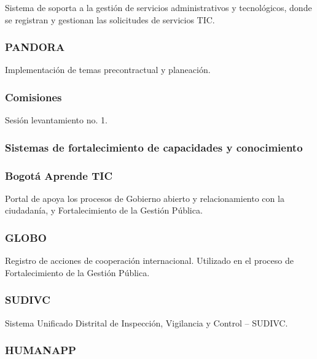 \documentclass[
	a4paper, %
	12pt, %
]{include/CSSullivanBusinessReport}
\begin{document}
Sistema de soporta a la gestión de servicios administrativos y
tecnológicos, donde se registran y gestionan las solicitudes de
servicios TIC.

\subsubsection{PANDORA}\label{sec:pandora}

Implementación de temas precontractual y planeación.

\subsubsection{Comisiones}\label{sec:comisiones}

Sesión levantamiento no. 1.

\subsubsection{Sistemas de fortalecimiento de capacidades y
conocimiento}\label{sec:sistemas-de-fortalecimiento-de-capacidades-y-conocimiento}

\subsubsection{Bogotá Aprende TIC}\label{sec:bogotuxe1-aprende-tic}

Portal de apoya los procesos de Gobierno abierto y relacionamiento con
la ciudadanía, y Fortalecimiento de la Gestión Pública.

\subsubsection{GLOBO}\label{sec:globo}

Registro de acciones de cooperación internacional. Utilizado en el
proceso de Fortalecimiento de la Gestión Pública.

\subsubsection{SUDIVC}\label{sec:sudivc}

Sistema Unificado Distrital de Inspección, Vigilancia y Control --
SUDIVC.

\subsubsection{HUMANAPP}\label{sec:humanapp}
\end{document}
